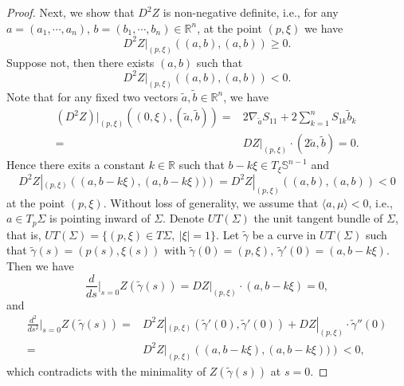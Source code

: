 \documentclass[10pt,a4paper]{amsart}
\begin{document}
\begin{proof}
Next, we show that $D^2Z$ is non-negative definite, i.e., for any $a=(a_1,\cdots,a_n)$, $b=(b_1,\cdots,b_n)\in\mathbb{R}^n$, at the point $(p,\xi)$ we have
	\begin{equation*}
	D^2Z|_{(p,\xi)}\left((a,b),(a,b)\right)\geq 0.
	\end{equation*}
	Suppose not, then there exists $(a,b)$ such that
	\begin{equation*}
	D^2Z|_{(p,\xi)}\left((a,b),(a,b)\right)<0.
	\end{equation*}
	Note that for any fixed two vectors $\tilde{a},\tilde{b}\in\mathbb{R}^{n}$, we have
	\begin{align*}
	(D^2Z)|_{(p,\xi)}((0,\xi),(\tilde{a},\tilde{b}))=&2\nabla_{\tilde{a}}S_{11}+2\sum_{k=1}^{n}S_{1k}\tilde{b}_k\\
=&DZ|_{(p,\xi)}\cdot \left(2\tilde{a},\tilde{b}\right)=0.
	\end{align*}
	Hence there exits a constant $k\in\mathbb{R}$ such that $b-k\xi\in T_{\xi}\mathbb{S}^{n-1}$ and
	\begin{equation*}
	D^2Z|_{(p,\xi)}\left((a,b-k\xi),(a,b-k\xi))\right)=D^2Z|_{(p,\xi)}\left((a,b),(a,b)\right)<0
	\end{equation*}
	at the point $(p,\xi)$. Without loss of generality, we assume that $\langle a,\mu\rangle<0$, i.e., $a\in T_p\Sigma$ is pointing inward of $\Sigma$. Denote $UT(\Sigma)$ the unit tangent bundle of $\Sigma$, that is, $UT(\Sigma)=\{(p,\xi)\in T\Sigma, ~|\xi|=1\}$. Let $\tilde{\gamma}$ be a curve in $UT(\Sigma)$  such that $\tilde{\gamma}(s)=(p(s),\xi(s))$ with $\tilde{\gamma}(0)=(p,\xi),\ \tilde{\gamma}'(0)=(a,b-k\xi)$. Then we have
	\begin{equation*}
	\frac{d}{ds}\Big|_{s=0}Z(\tilde{\gamma}(s))=DZ|_{(p,\xi)}\cdot(a,b-k\xi)=0,
	\end{equation*}
	and
	\begin{align*} \frac{d^2}{ds^2}\Big|_{s=0}Z(\tilde{\gamma}(s))=&D^2Z|_{(p,\xi)}(\tilde{\gamma}'(0),\tilde{\gamma}'(0))+DZ|_{(p,\xi)}\cdot\tilde{\gamma}''(0)\\
	=&D^2Z|_{(p,\xi)}\left((a,b-k\xi),(a,b-k\xi))\right)<0,
	\end{align*}
	which contradicts with the minimality of $Z(\tilde{\gamma}(s))$ at $s=0$.
\end{proof}
\end{document}
